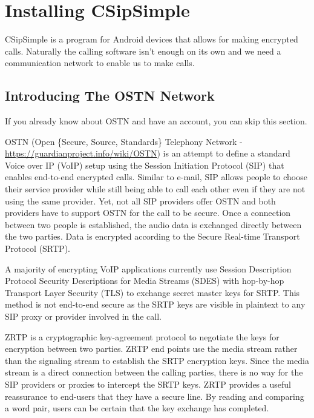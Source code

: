 \section{Installing CSipSimple}

CSipSimple is a program for Android devices that allows for making
encrypted calls. Naturally the calling software isn't enough on its own
and we need a communication network to enable us to make calls.

\subsection{Introducing The OSTN Network}

If you already know about OSTN and have an account, you can skip this
section.

OSTN (Open \{Secure, Source, Standards\} Telephony Network -
\href{https://guardianproject.info/wiki/OSTN}{https://guardianproject.info/wiki/OSTN})
is an attempt to define a standard Voice over IP (VoIP) setup using the
Session Initiation Protocol (SIP) that enables end-to-end encrypted
calls. Similar to e-mail, SIP allows people to choose their service
provider while still being able to call each other even if they are not
using the same provider. Yet, not all SIP providers offer OSTN and both
providers have to support OSTN for the call to be secure. Once a
connection between two people is established, the audio data is
exchanged directly between the two parties. Data is encrypted according
to the Secure Real-time Transport Protocol (SRTP).

A majority of encrypting VoIP applications currently use Session
Description Protocol Security Descriptions for Media Streams (SDES) with
hop-by-hop Transport Layer Security (TLS) to exchange secret master keys
for SRTP. This method is not end-to-end secure as the SRTP keys are
visible in plaintext to any SIP proxy or provider involved in the call.

ZRTP is a cryptographic key-agreement protocol to negotiate the keys for
encryption between two parties. ZRTP end points use the media stream
rather than the signaling stream to establish the SRTP encryption keys.
Since the media stream is a direct connection between the calling
parties, there is no way for the SIP providers or proxies to intercept
the SRTP keys. ZRTP provides a useful reassurance to end-users that they
have a secure line. By reading and comparing a word pair, users can be
certain that the key exchange has completed.

